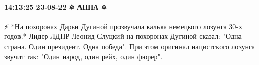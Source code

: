  
 
 
 
 

\paragraph{14:13:25 23-08-22 🔯 АННА 🔯}

⚡️ *На похоронах Дарьи Дугиной прозвучала калька немецкого лозунга 30-х годов.*
Лидер ЛДПР Леонид Слуцкий на похоронах Дугиной сказал: "Одна страна. Один
президент. Одна победа".  При этом оригинал нацистского лозунга звучит так:
"Один народ, один рейх, один фюрер".

